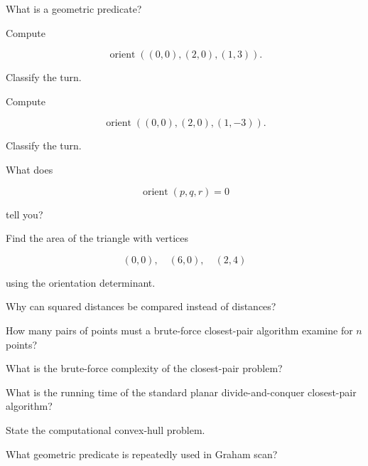 \begin{exercise}[1]
What is a geometric predicate?
\end{exercise}

\begin{exercise}[1]
Compute

\[
\operatorname{orient}
((0,0),(2,0),(1,3)).
\]

Classify the turn.
\end{exercise}

\begin{exercise}[1]
Compute

\[
\operatorname{orient}
((0,0),(2,0),(1,-3)).
\]

Classify the turn.
\end{exercise}

\begin{exercise}[1]
What does

\[
\operatorname{orient}(p,q,r)=0
\]

tell you?
\end{exercise}

\begin{exercise}[1]
Find the area of the triangle with vertices

\[
(0,0),
\quad
(6,0),
\quad
(2,4)
\]

using the orientation determinant.
\end{exercise}

\begin{exercise}[1]
Why can squared distances be compared instead of distances?
\end{exercise}

\begin{exercise}[1]
How many pairs of points must a brute-force closest-pair algorithm examine
for \(n\) points?
\end{exercise}

\begin{exercise}[1]
What is the brute-force complexity of the closest-pair problem?
\end{exercise}

\begin{exercise}[1]
What is the running time of the standard planar divide-and-conquer
closest-pair algorithm?
\end{exercise}

\begin{exercise}[1]
State the computational convex-hull problem.
\end{exercise}

\begin{exercise}[1]
What geometric predicate is repeatedly used in Graham scan?
\end{exercise}

